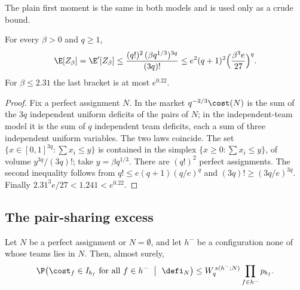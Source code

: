 The plain first moment is the same in both models and is used only as a crude bound.

\begin{lemma}\label{lem:transfer-plain}
For every $\beta>0$ and $q\ge1$,
\[
\E[Z_\beta]=\E'[Z_\beta]\le\frac{(q!)^2\,(\beta q^{1/3})^{3q}}{(3q)!}
\le e^2(q+1)^2\Bigl(\frac{\beta^3e}{27}\Bigr)^{q}.
\]
For $\beta\le2.31$ the last bracket is at most $e^{0.22}$.
\end{lemma}

\begin{proof}
Fix a perfect assignment $N$. In the market $q^{-2/3}\cost(N)$ is the sum of the $3q$ independent
uniform deficits of the pairs of $N$; in the independent-team model it is the sum of $q$
independent team deficits, each a sum of three independent uniform variables. The two laws
coincide. The set $\{x\in[0,1]^{3q}:\sum x_i\le y\}$ is contained in the simplex
$\{x\ge0:\sum x_i\le y\}$, of volume $y^{3q}/(3q)!$; take $y=\beta q^{1/3}$. There are $(q!)^2$
perfect assignments. The second inequality follows from $q!\le e(q+1)(q/e)^q$ and
$(3q)!\ge(3q/e)^{3q}$. Finally $2.31^3e/27<1.241<e^{0.22}$.
\end{proof}

\subsection{The pair-sharing excess}\label{sec:transfer-excess}

\begin{lemma}\label{lem:transfer-excess}
Let $N$ be a perfect assignment or $N=\emptyset$, and let $h^-$ be a configuration none of
whose teams lies in $N$. Then, almost surely,
\[
\P\bigl(\cost_f\in I_{b_f}\ \text{for all }f\in h^-\ \bigm|\ \defi_N\bigr)
\le W_q^{\,s(h^-;N)}\prod_{f\in h^-}p_{b_f}.
\]
\end{lemma}

